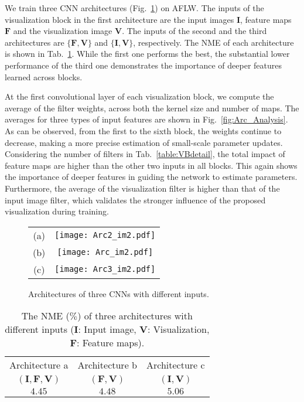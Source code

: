 We train three CNN architectures (Fig.~\ref{fig:Arc}) on AFLW. 
The inputs of the visualization block in the first architecture are the input images $\textbf{I}$, feature maps $\textbf{F}$ and the visualization image $\textbf{V}$. The inputs of the second and the third architectures are $\{\textbf{F}, \textbf{V}\}$ and $\{\textbf{I},\textbf{V}\}$, respectively. 
The NME of each architecture is shown in Tab.~\ref{table:diffArch}.
While the first one performs the best, the substantial lower performance of the third one demonstrates the importance of deeper features learned across blocks.


At the first convolutional layer of each visualization block, we compute the average of the filter weights, across both the kernel size and number of maps.
The averages for three types of input features are shown in Fig.~\ref{fig:Arc_Analysis}.
As can be observed, from the first to the sixth block, the weights continue to decrease, making a more precise estimation of small-scale parameter updates. 
Considering the number of filters in Tab.~\ref{table:VBdetail}, the total impact of feature maps are higher than the other two inputs in all blocks. 
This again shows the importance of deeper features in guiding the network to estimate parameters. 
Furthermore, the average of the visualization filter is higher than that of the input image filter, which validates the stronger influence of the proposed visualization during training. 





\begin{figure}[t!]\small
\begin{center}
\begin{tabular}{cc}
(a) & \texttt{[image: Arc2\_im2.pdf]} \\
(b) & \texttt{[image: Arc\_im2.pdf]} \\
(c) & \texttt{[image: Arc3\_im2.pdf]}
\end{tabular}
\end{center}
\figvspace
\caption{Architectures of three CNNs with different inputs.} 
\label{fig:Arc}\figvspace
\end{figure}


\begin{table}[t!]\small
\caption{The NME ($\%$) of three architectures with different inputs ($\textbf{I}$: Input image, $\textbf{V}$: Visualization, $\textbf{F}$: Feature maps).}\figvspace
\begin{center}
\begin{tabular}{ c|c|c } 
 \hline
 Architecture a & Architecture b & Architecture c \\ 
 $(\textbf{I},\textbf{F},\textbf{V})$ & $(\textbf{F}, \textbf{V})$ & $(\textbf{I},\textbf{V})$\\
 \hline
 $4.45$ & $4.48$ & $5.06$ \\
 \hline  
\end{tabular}
\end{center}
\label{table:diffArch}
\end{table}






